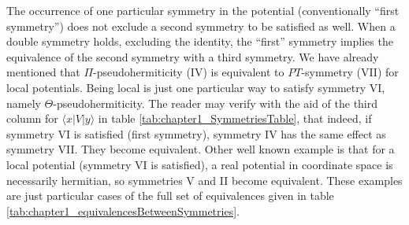 The occurrence of one particular symmetry in the potential (conventionally  ``first symmetry'')
does not exclude a second symmetry to be satisfied as well.
When a double symmetry holds, excluding the identity,  the ``first'' symmetry  implies the equivalence of the second symmetry with a third symmetry.
We have already mentioned that $\Pi$-pseudohermiticity (IV) is equivalent to $PT$-symmetry (VII) for local potentials.
Being local is just one particular way to satisfy symmetry VI, namely $\Theta$-pseudohermiticity. The reader may verify with the aid of
the third column for $\langle x|V|y\rangle$  in table \ref{tab:chapter1_SymmetriesTable}, that indeed, if symmetry VI is satisfied (first symmetry), symmetry IV has the same effect as symmetry VII.
They become equivalent. Other well known example is  that for a local potential (symmetry VI is satisfied), a real potential in coordinate space  is necessarily hermitian,
so symmetries V and II become equivalent.
These examples are just particular cases of the full set of equivalences given in table \ref{tab:chapter1_equivalencesBetweenSymmetries}.

\begin{table}
  \caption{Equivalences among symmetries for the potential elements.
  Given the symmetry of the upper row, the table provides the equivalent symmetries.
  For example, if II is satisfied, then III=IV holds. In words, if the potential is hermitian,  parity symmetry amounts to
  parity pseudohermiticity. In terms of the matrix elements of the potential, if  $\langle x|V|y\rangle=\langle y|V|x\rangle^*$ and also
  $\langle x|V|y\rangle=\langle -x|V|-y\rangle$, $\forall (x,y)$, then $\langle x|V|y\rangle=\langle -y|V|-x\rangle^*$ holds as well. One may proceed similarly for all other relations.
  The commutation with the identity (I) is excluded as this symmetry is satisfied by all potentials.\vspace*{.2cm}
  \label{tab:chapter1_equivalencesBetweenSymmetries}}
  \centering

\end{table}



